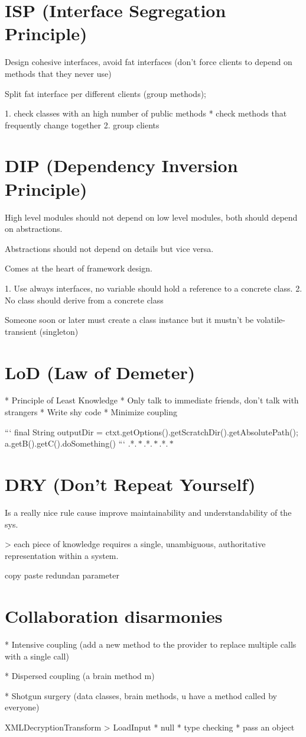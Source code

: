 \section{ISP (Interface Segregation Principle)}

Design cohesive interfaces, avoid fat interfaces 
(don't force clients to depend on methods that they never use)

Split fat interface per different clients (group methods);

1. check classes with an high number of public methods
    * check methods that frequently change together
2. group clients


\section{DIP (Dependency Inversion Principle)}

High level modules should not depend on low level modules, both should 
depend on abstractions.

Abstractions should not depend on details but vice versa.

Comes at the heart of framework design.

1. Use always interfaces, no variable should hold a reference to a concrete class.
2. No class should derive from a concrete class 

Someone soon or later must create a class instance but it mustn't be 
volatile-transient (singleton) 


\section{LoD (Law of Demeter)}

* Principle of Least Knowledge
* Only talk to immediate friends, don't talk with strangers
* Write shy code
* Minimize coupling

```
final String outputDir = ctxt.getOptions().getScratchDir().getAbsolutePath(); 
a.getB().getC().doSomething() 
```
.*\(.*\).*\(.*\).*\(.*\)


\section{DRY (Don't Repeat Yourself)}

Is a really nice rule cause improve maintainability and understandability
of the sys. 

> each piece of knowledge requires a single, unambiguous, authoritative representation
within a system.

copy paste
redundan parameter


\section{Collaboration disarmonies}

* Intensive coupling 
(add a new method to the provider to replace multiple calls with a single call)

* Dispersed coupling (a brain method m)

* Shotgun surgery (data classes, brain methods, u have a method called by everyone)


XMLDecryptionTransform > LoadInput 
* null 
* type checking
* pass an object